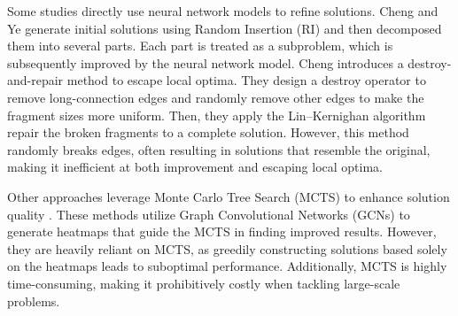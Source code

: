 Some studies directly use neural network models to refine solutions. Cheng \cite{cheng2023select} and Ye \cite{ye2024glop} generate initial solutions using Random Insertion (RI) and then decomposed them into several parts. Each part is treated as a subproblem, which is subsequently improved by the neural network model. Cheng \cite{cheng2023select} introduces a destroy-and-repair method to escape local optima. They design a destroy operator to remove long-connection edges and randomly remove other edges to make the fragment sizes more uniform. Then, they apply the Lin–Kernighan algorithm \cite{helsgaun2000effective} repair the broken fragments to a complete solution. However, this method randomly breaks edges, often resulting in solutions that resemble the original, making it inefficient at both improvement and escaping local optima.

Other approaches leverage Monte Carlo Tree Search (MCTS) to enhance solution quality \cite{fu2021generalize,qiu2022dimes,sun2023difusco}. These methods utilize Graph Convolutional Networks (GCNs) \cite{kipf2016semi} to generate heatmaps that guide the MCTS in finding improved results. However, they are heavily reliant on MCTS, as greedily constructing solutions based solely on the heatmaps leads to suboptimal performance. Additionally, MCTS is highly time-consuming, making it prohibitively costly when tackling large-scale problems.
